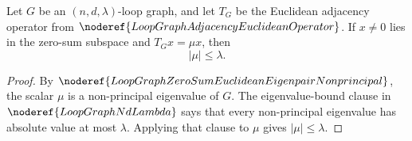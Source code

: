 \begin{helper}
Let \(G\) be an \((n,d,\lambda)\)-loop graph, and let \(T_G\) be the Euclidean
adjacency operator from \(\noderef{LoopGraphAdjacencyEuclideanOperator}\).  If
\(x\neq 0\) lies in the zero-sum subspace and \(T_Gx=\mu x\), then
\[
  |\mu|\le \lambda .
\]
\end{helper}
\begin{proof}
By \(\noderef{LoopGraphZeroSumEuclideanEigenpairNonprincipal}\), the scalar
\(\mu\) is a non-principal eigenvalue of \(G\).  The eigenvalue-bound clause in
\(\noderef{LoopGraphNdLambda}\) says that every non-principal eigenvalue has
absolute value at most \(\lambda\).  Applying that clause to \(\mu\) gives
\(|\mu|\le \lambda\).
\end{proof}
